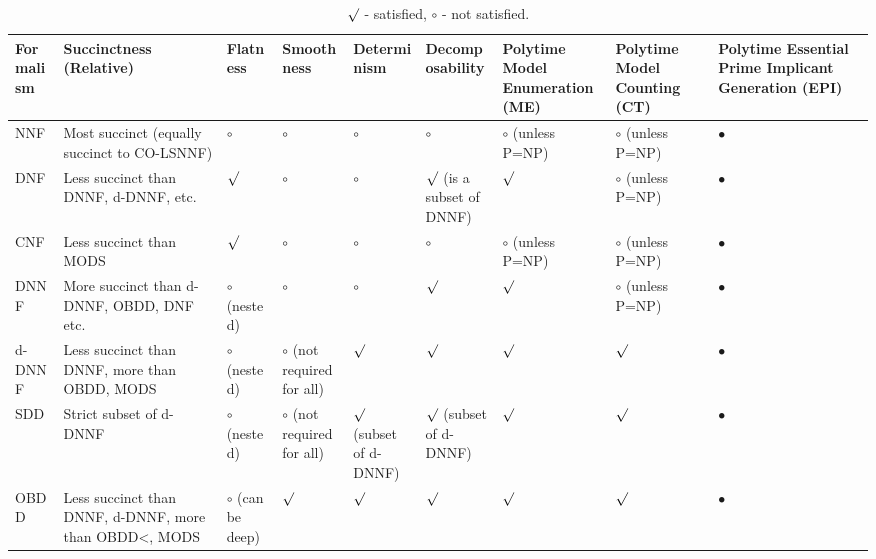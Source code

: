 \begin{table}
    \centering
    \begin{tabularx}{\textwidth}{XXXXXXXXX}
        \toprule
        Formalism & Succinctness (Relative) & Flatness & Smoothness & Determinism & Decomposability & Polytime Model Enumeration (ME) & Polytime Model Counting (CT) & Polytime Essential Prime Implicant Generation (EPI) \\ \midrule
        NNF & Most succinct (equally succinct to CO-LSNNF) & $\circ$ & $\circ$ & $\circ$ & $\circ$ & $\circ$ (unless P=NP) & $\circ$ (unless P=NP) & $\bullet$ \\
        DNF & Less succinct than DNNF, d-DNNF, etc. & $\surd$ & $\circ$ & $\circ$ & $\surd$ (is a subset of DNNF) & $\surd$ & $\circ$ (unless P=NP) & $\bullet$ \\
        CNF & Less succinct than MODS & $\surd$ & $\circ$ & $\circ$ & $\circ$ & $\circ$ (unless P=NP) & $\circ$ (unless P=NP) & $\bullet$ \\
        DNNF & More succinct than d-DNNF, OBDD, DNF etc. & $\circ$ (nested) & $\circ$ & $\circ$ & $\surd$ & $\surd$ & $\circ$ (unless P=NP) & $\bullet$ \\
        d-DNNF & Less succinct than DNNF, more than OBDD, MODS & $\circ$ (nested) & $\circ$ (not required for all) & $\surd$ & $\surd$ & $\surd$ & $\surd$ & $\bullet$ \\
        SDD & Strict subset of d-DNNF & $\circ$ (nested) & $\circ$ (not required for all) & $\surd$ (subset of d-DNNF) & $\surd$ (subset of d-DNNF) & $\surd$ & $\surd$ & $\bullet$ \\
        OBDD & Less succinct than DNNF, d-DNNF, more than OBDD<, MODS & $\circ$ (can be deep) & $\surd$ & $\surd$ & $\surd$ & $\surd$ & $\surd$ & $\bullet$ \\
        \bottomrule
    \end{tabularx}
    \caption{$\surd$ - satisfied, $\circ$ - not satisfied.}
\end{table}


% 

